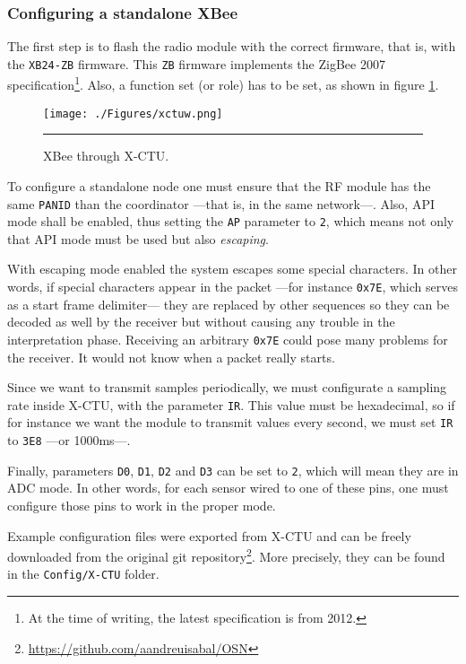 \subsubsection{Configuring a standalone XBee\textregistered{}}
\label{subsub:coxbee}

The first step is to flash the radio module with the correct firmware, that is, with the \texttt{XB24-ZB} firmware. This \texttt{ZB} firmware implements the ZigBee 2007 specification\footnote{At the time of writing, the latest specification is from 2012.}. Also, a function set (or role) has to be set, as shown in figure \ref{fig:xctuw}.

\begin{figure}[htbp]
    \centering
        \texttt{[image: ./Figures/xctuw.png]}
        \rule{35em}{0.5pt}
        \caption[XBee\textregistered{} through X-CTU]{XBee\textregistered{} through X-CTU.}
    \label{fig:xctuw}
\end{figure}

To configure a standalone node one must ensure that the RF module has the same \texttt{PANID} than the coordinator ---that is, in the same network---. Also, API mode shall be enabled, thus setting the \texttt{AP} parameter to \texttt{2}, which means not only that API mode must be used but also \emph{escaping}.

With escaping mode enabled the system escapes some special characters. In other words, if special characters appear in the packet ---for instance \texttt{0x7E}, which serves as a start frame delimiter--- they are replaced by other sequences so they can be decoded as well by the receiver but without causing any trouble in the interpretation phase. Receiving an arbitrary \texttt{0x7E} could pose many problems for the receiver. It would not know when a packet really starts\citep{digi:escapedchars}.

Since we want to transmit samples periodically, we must configurate a sampling rate inside X-CTU, with the parameter \texttt{IR}. This value must be hexadecimal, so if for instance we want the module to transmit values every second, we must set \texttt{IR} to \texttt{3E8} ---or 1000ms---.

Finally, parameters \texttt{D0}, \texttt{D1}, \texttt{D2} and \texttt{D3} can be set to \texttt{2}, which will mean they are in ADC mode. In other words, for each sensor wired to one of these pins, one must configure those pins to work in the proper mode.

Example configuration files were exported from X-CTU and can be freely downloaded from the original git repository\footnote{\url{https://github.com/aandreuisabal/OSN}}. More precisely, they can be found in the \texttt{Config/X-CTU} folder.

